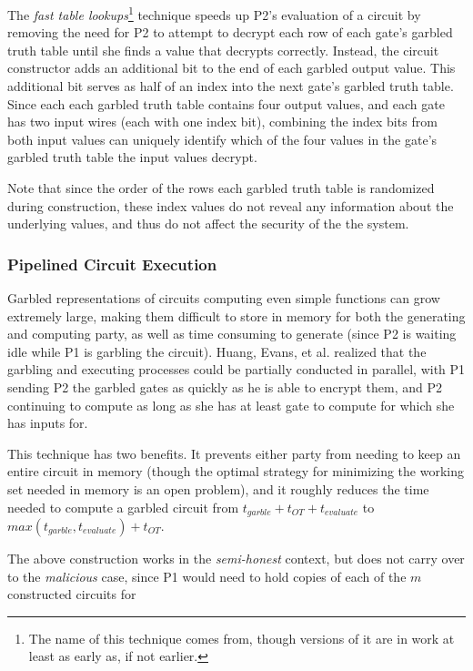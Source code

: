 The \emph{fast table lookups}\footnote{The name of this technique comes from\cite{huang2011faster}, though versions of it are in work at least as early as\cite{malkhi2004fairplay}, if not earlier.} technique speeds up \ac{P2}'s evaluation of a circuit by removing the need for \ac{P2} to attempt to decrypt each row of each gate's garbled truth table until she finds a value that decrypts correctly.  Instead, the circuit constructor adds an additional bit to the end of each garbled output value. This additional bit serves as half of an index into the next gate's garbled truth table. Since each each garbled truth table contains four output values, and each gate has two input wires (each with one index bit), combining the index bits from both input values can uniquely identify which of the four values in the gate's garbled truth table the input values decrypt.

Note that since the order of the rows each garbled truth table is randomized during construction, these index values do not reveal any information about the underlying values, and thus do not affect the security of the the system.

\subsubsection{Pipelined Circuit Execution}

Garbled representations of circuits computing even simple functions can grow extremely large, making them difficult to store in memory for both the generating and computing party, as well as time consuming to generate (since \ac{P2} is waiting idle while \ac{P1} is garbling the circuit).  Huang, Evans, et al.\cite{huang2011faster} realized that the garbling and executing processes could be partially conducted in parallel, with \ac{P1} sending \ac{P2} the garbled gates as quickly as he is able to encrypt them, and \ac{P2} continuing to compute as long as she has at least gate to compute for which she has inputs for.

This technique has two benefits.  It prevents either party from needing to keep an entire circuit in memory (though the optimal strategy for minimizing the working set needed in memory is an open problem\cite{kreuter2012billion}), and it roughly reduces the time needed to compute a garbled circuit from $t_{garble} + t_{OT} + t_{evaluate}$ to $max(t_{garble}, t_{evaluate}) + t_{OT}$.

The above construction works in the \emph{semi-honest} context, but does not carry over to the \emph{malicious} case, since \ac{P1} would need to hold copies of each of the $m$ constructed circuits for

